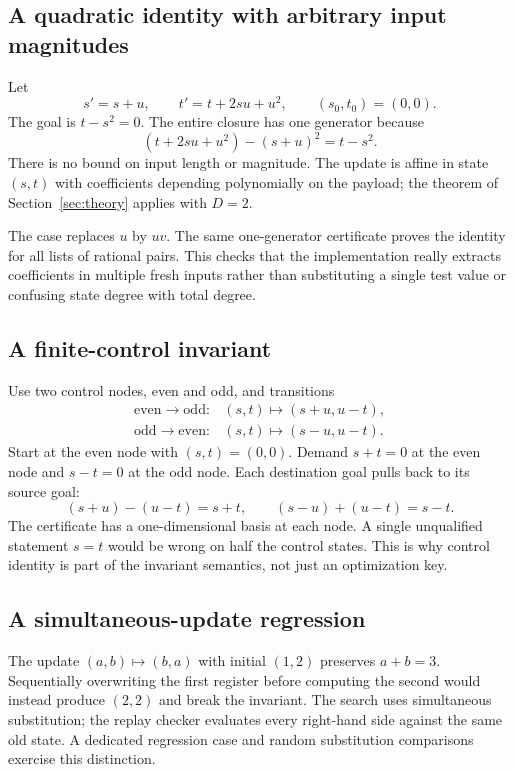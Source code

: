 \subsection{A quadratic identity with arbitrary input magnitudes}
Let
\[
 s'=s+u,\qquad t'=t+2su+u^2,
 \qquad (s_0,t_0)=(0,0).
\]
The goal is $t-s^2=0$. The entire closure has one generator because
\[
 (t+2su+u^2)-(s+u)^2=t-s^2.
\]
There is no bound on input length or magnitude. The update is affine in state
$(s,t)$ with coefficients depending polynomially on the payload; the theorem
of Section~\ref{sec:theory} applies with $D=2$.

The case  replaces $u$ by $uv$. The same one-generator
certificate proves the identity for all lists of rational pairs. This checks
that the implementation really extracts coefficients in multiple fresh inputs
rather than substituting a single test value or confusing state degree with
total degree.

\subsection{A finite-control invariant}
Use two control nodes, even and odd, and transitions
\begin{align*}
 \text{even}\to\text{odd}:&(s,t)\mapsto(s+u,u-t),\\
 \text{odd}\to\text{even}:&(s,t)\mapsto(s-u,u-t).
\end{align*}
Start at the even node with $(s,t)=(0,0)$. Demand $s+t=0$ at the even node and
$s-t=0$ at the odd node. Each destination goal pulls back to its source goal:
\[
 (s+u)-(u-t)=s+t,\qquad
 (s-u)+(u-t)=s-t.
\]
The certificate has a one-dimensional basis at each node. A single unqualified
statement $s=t$ would be wrong on half the control states. This is why control
identity is part of the invariant semantics, not just an optimization key.

\subsection{A simultaneous-update regression}
The update $(a,b)\mapsto(b,a)$ with initial $(1,2)$ preserves $a+b=3$.
Sequentially overwriting the first register before computing the second would
instead produce $(2,2)$ and break the invariant. The search uses simultaneous
substitution; the replay checker evaluates every right-hand side against the
same old state. A dedicated regression case and random substitution comparisons
exercise this distinction.

